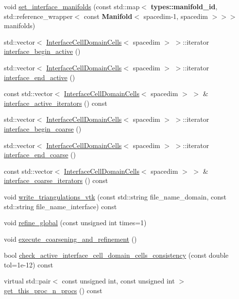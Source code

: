 \begin{DoxyCompactItemize}
\item 
void \hyperlink{class_triangulation_system_afb5564d01d3914b15b552f95648d231b}{set\+\_\+interface\+\_\+manifolds} (const std\+::map$<$ {\bf types\+::manifold\+\_\+id}, std\+::reference\+\_\+wrapper$<$ const {\bf Manifold}$<$ spacedim-\/1, spacedim $>$$>$$>$ manifolds)
\item 
std\+::vector$<$ \hyperlink{class_interface_cell_domain_cells}{Interface\+Cell\+Domain\+Cells}$<$ spacedim $>$ $>$\+::iterator \hyperlink{class_triangulation_system_abbbd02a7e813a0604d072480bda93b1a}{interface\+\_\+begin\+\_\+active} ()
\item 
std\+::vector$<$ \hyperlink{class_interface_cell_domain_cells}{Interface\+Cell\+Domain\+Cells}$<$ spacedim $>$ $>$\+::iterator \hyperlink{class_triangulation_system_abcab5ca315d720879468cf92a820c29a}{interface\+\_\+end\+\_\+active} ()
\item 
const std\+::vector$<$ \hyperlink{class_interface_cell_domain_cells}{Interface\+Cell\+Domain\+Cells}$<$ spacedim $>$ $>$ \& \hyperlink{class_triangulation_system_a6e3f8531f86b7404e5cb28f5e88e9cd2}{interface\+\_\+active\+\_\+iterators} () const 
\item 
std\+::vector$<$ \hyperlink{class_interface_cell_domain_cells}{Interface\+Cell\+Domain\+Cells}$<$ spacedim $>$ $>$\+::iterator \hyperlink{class_triangulation_system_aaf68847ea61f015fce319bb9810833f4}{interface\+\_\+begin\+\_\+coarse} ()
\item 
std\+::vector$<$ \hyperlink{class_interface_cell_domain_cells}{Interface\+Cell\+Domain\+Cells}$<$ spacedim $>$ $>$\+::iterator \hyperlink{class_triangulation_system_a1595839f52f5f5b9d7af31836f9c1f0f}{interface\+\_\+end\+\_\+coarse} ()
\item 
const std\+::vector$<$ \hyperlink{class_interface_cell_domain_cells}{Interface\+Cell\+Domain\+Cells}$<$ spacedim $>$ $>$ \& \hyperlink{class_triangulation_system_aff36f319e3c837aa9b0522bc63f83bf3}{interface\+\_\+coarse\+\_\+iterators} () const 
\item 
void \hyperlink{class_triangulation_system_a2b90f1509c910930c1404548fa860d8c}{write\+\_\+triangulations\+\_\+vtk} (const std\+::string file\+\_\+name\+\_\+domain, const std\+::string file\+\_\+name\+\_\+interface) const 
\item 
void \hyperlink{class_triangulation_system_a8aa29c77fd798ddd8a5e20806ea21558}{refine\+\_\+global} (const unsigned int times=1)
\item 
void \hyperlink{class_triangulation_system_a62be2563cc8d810a71941e15490f9840}{execute\+\_\+coarsening\+\_\+and\+\_\+refinement} ()
\item 
bool \hyperlink{class_triangulation_system_a53b005b496d27529bce82f1ed05fed0e}{check\+\_\+active\+\_\+interface\+\_\+cell\+\_\+domain\+\_\+cells\+\_\+consistency} (const double tol=1e-\/12) const 
\item 
virtual std\+::pair$<$ const unsigned int, const unsigned int $>$ \hyperlink{class_triangulation_system_abf6f1a3377be207410b4fd1a9568fb76}{get\+\_\+this\+\_\+proc\+\_\+n\+\_\+procs} () const 
\end{DoxyCompactItemize}
